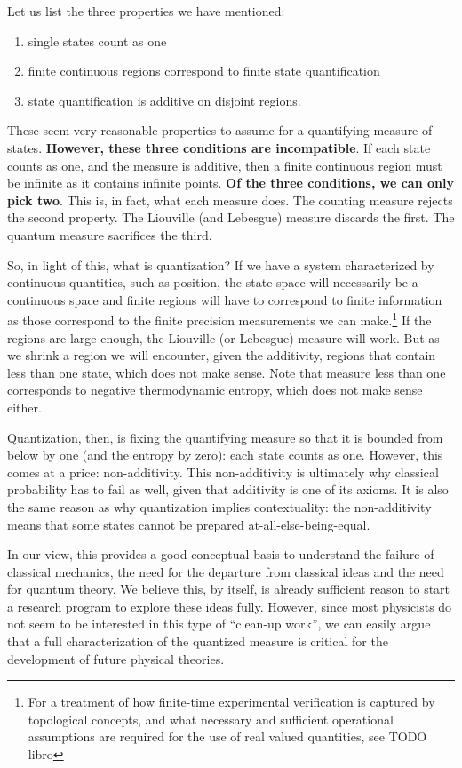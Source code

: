 \documentclass[10pt,twocolumn, nofootinbib]{revtex4-2}
\begin{document}
Let us list the three properties we have mentioned:
\begin{enumerate}
	\item single states count as one
	\item finite continuous regions correspond to finite state quantification
	\item state quantification is additive on disjoint regions.
\end{enumerate}
These seem very reasonable properties to assume for a quantifying measure of states. \textbf{However, these three conditions are incompatible}. If each state counts as one, and the measure is additive, then a finite continuous region must be infinite as it contains infinite points. \textbf{Of the three conditions, we can only pick two}. This is, in fact, what each measure does. The counting measure rejects the second property. The Liouville (and Lebesgue) measure discards the first. The quantum measure sacrifices the third.

So, in light of this, what is quantization? If we have a system characterized by continuous quantities, such as position, the state space will necessarily be a continuous space and finite regions will have to correspond to finite information as those correspond to the finite precision measurements we can make.\footnote{For a treatment of how finite-time experimental verification is captured by topological concepts, and what necessary and sufficient operational assumptions are required for the use of real valued quantities, see TODO libro} If the regions are large enough, the Liouville (or Lebesgue) measure will work. But as we shrink a region we will encounter, given the additivity, regions that contain less than one state, which does not make sense. Note that measure less than one corresponds to negative thermodynamic entropy, which does not make sense either.

Quantization, then, is fixing the quantifying measure so that it is bounded from below by one (and the entropy by zero): each state counts as one. However, this comes at a price: non-additivity. This non-additivity is ultimately why classical probability has to fail as well, given that additivity is one of its axioms. It is also the same reason as why quantization implies contextuality: the non-additivity means that some states cannot be prepared at-all-else-being-equal.

In our view, this provides a good conceptual basis to understand the failure of classical mechanics, the need for the departure from classical ideas and the need for quantum theory. We believe this, by itself, is already sufficient reason to start a research program to explore these ideas fully. However, since most physicists do not seem to be interested in this type of ``clean-up work'', we can easily argue that a full characterization of the quantized measure is critical for the development of future physical theories.
\end{document}
